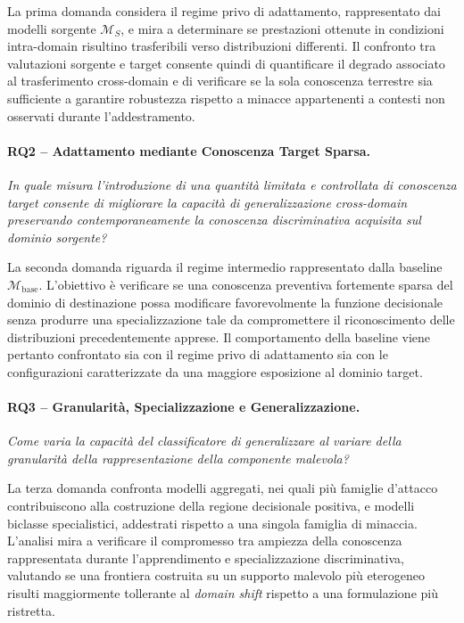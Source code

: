 La prima domanda considera il regime privo di adattamento, rappresentato dai modelli sorgente $\mathcal{M}_{S}$, e mira a determinare se prestazioni ottenute in condizioni intra-domain risultino trasferibili verso distribuzioni differenti. 
Il confronto tra valutazioni sorgente e target consente quindi di quantificare il degrado associato al trasferimento cross-domain e di verificare se la sola conoscenza terrestre sia sufficiente a garantire robustezza rispetto a minacce appartenenti a contesti non osservati durante l'addestramento.

\paragraph{RQ2 -- Adattamento mediante Conoscenza Target Sparsa.}
\textit{In quale misura l'introduzione di una quantità limitata e controllata di conoscenza target consente di migliorare la capacità di generalizzazione cross-domain preservando contemporaneamente la conoscenza discriminativa acquisita sul dominio sorgente?}

La seconda domanda riguarda il regime intermedio rappresentato dalla baseline $\mathcal{M}_{\mathrm{base}}$. 
L'obiettivo è verificare se una conoscenza preventiva fortemente sparsa del dominio di destinazione possa modificare favorevolmente la funzione decisionale senza produrre una specializzazione tale da compromettere il riconoscimento delle distribuzioni precedentemente apprese. 
Il comportamento della baseline viene pertanto confrontato sia con il regime privo di adattamento sia con le configurazioni caratterizzate da una maggiore esposizione al dominio target.

\paragraph{RQ3 -- Granularità, Specializzazione e Generalizzazione.}
\textit{Come varia la capacità del classificatore di generalizzare al variare della granularità della rappresentazione della componente malevola?}

La terza domanda confronta modelli aggregati, nei quali più famiglie d'attacco contribuiscono alla costruzione della regione decisionale positiva, e modelli biclasse specialistici, addestrati rispetto a una singola famiglia di minaccia. 
L'analisi mira a verificare il compromesso tra ampiezza della conoscenza rappresentata durante l'apprendimento e specializzazione discriminativa, valutando se una frontiera costruita su un supporto malevolo più eterogeneo risulti maggiormente tollerante al \textit{domain shift} rispetto a una formulazione più ristretta.

